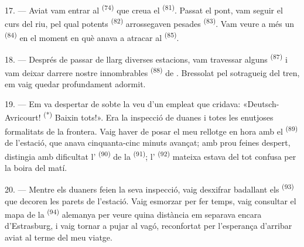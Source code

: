 17. --- Aviat vam entrar al  \textsuperscript{(74)} que creua
el  \textsuperscript{(81)}. Passat el pont, vam seguir el curs del
riu, pel qual potents  \textsuperscript{(82)} arrossegaven
pesades  \textsuperscript{(83)}. Vam veure a més un
 \textsuperscript{(84)} en el moment en què anava a
atracar al  \textsuperscript{(85)}.

18. --- Després de passar de llarg diverses estacions, vam travessar alguns
 \textsuperscript{(87)} i vam deixar darrere nostre innombrables
 \textsuperscript{(88)} de . Bressolat pel
sotragueig del tren, em vaig quedar profundament adormit.

\VUsaut{3.0mm}
\VUsaut{3.0mm}

19. --- Em va despertar de sobte la veu d'un empleat que cridava:
«Deutsch-Avricourt! \textsuperscript{(*)} Baixin tots!». Era la inspecció de
duanes i totes les enutjoses formalitats de la frontera. Vaig haver de posar el
meu rellotge en hora amb el  \textsuperscript{(89)} de l'estació,
que anava cinquanta-cinc minuts avançat; amb prou feines despert, distingia amb
dificultat l' \textsuperscript{(90)} de la 
\textsuperscript{(91)}; l' \textsuperscript{(92)} mateixa estava del
tot confusa per la boira del matí.

20. --- Mentre els duaners feien la seva inspecció, vaig desxifrar badallant els
 \textsuperscript{(93)} que decoren les parets de l'estació. Vaig
esmorzar per fer temps, vaig consultar el mapa de la 
\textsuperscript{(94)} alemanya per veure quina distància em separava encara
d'Estrasburg, i vaig tornar a pujar al vagó, reconfortat per l'esperança
d'arribar aviat al terme del meu viatge.
\VUsaut{6.0mm}
\VUfilet{22mm}
